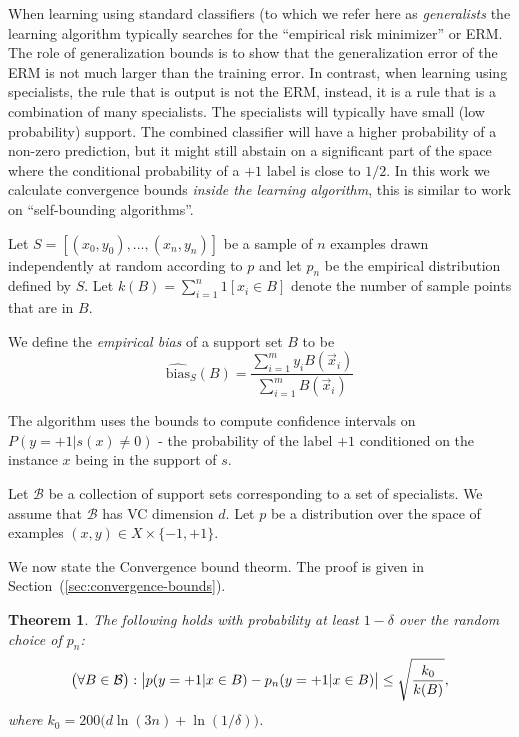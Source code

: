\documentclass{article}
\newtheorem{theorem}{Theorem}[section]
\newcommand{\B}{{\cal B}}
\newcommand{\x}{\vec{x}}
\newcommand{\cB}{\mathcal{B}}
\newcommand{\ebias}{\widehat{\text{bias}}}
\newcommand{\samp}{S}
\newcommand{\comment}[3]{\marginpar{\textcolor{#2}{#1: #3}}}
\newcommand{\yoav}[1]{\comment{Yoav}{blue}{#1}}
\begin{document}
When learning using standard classifiers (to which we refer here as
{\em generalists} the learning algorithm typically searches for the
``empirical risk minimizer'' or ERM. The role of generalization bounds
is to show that the generalization error of the ERM is not much larger
than the training error. In contrast, when learning using specialists,
the rule that is output is not the ERM, instead, it is a rule that is
a combination of many specialists. The specialists will typically have
small (low probability) support. The combined classifier will have a
higher probability of a non-zero prediction, but it might still
abstain on a significant part of the space where the conditional
probability of a $+1$ label is close to $1/2$. In this work 
we calculate convergence bounds {\em inside the
  learning algorithm}, this is similar to work on ``self-bounding
algorithms''.
\fi

Let $\samp = [(x_0,y_0),\ldots,(x_n,y_n)]$ be a sample of $n$ examples
drawn independently at random according to $p$ and let $p_n$ be the
empirical distribution defined by $S$.  Let $k(B) = \sum_{i=1}^n
1[x_i\in B]$ denote the number of sample points that are in $B$.

We define the {\em empirical bias} of a support set $B$ to be
\[
\ebias_{\samp}(B) = \frac{\sum_{i=1}^m y_i B(\x_i)}{\sum_{i=1}^m B(\x_i)}
\]



The algorithm uses the bounds to compute confidence
intervals on $P(y=+1|s(x) \neq 0)$ - the probability of the label $+1$
conditioned on the instance $x$ being in the support of $s$.

Let $\cB$ be a collection of support sets corresponding to a set of
specialists. We assume that $\cB$ has VC dimension $d$. Let $p$ be a
distribution over the space of examples $(x,y) \in X \times
\{-1,+1\}$.


We now state the Convergence bound theorm. The proof is given in Section~(\ref{sec:convergence-bounds}).

\yoav{I don't think that the term ``uniform'' is appropriate here,
  because the bound is not uniform - there is a different bound for
  each rule, depending on $k$.}
\begin{theorem}\label{thm:UCECM}
The following holds with probability at least $1-\delta$ over the
random choice of $p_n$:
\[\bigl(\forall B\in\B\bigr):\bigl\lvert p( y=+1 \vert x \in B) -
p_n(y=+1 \vert x \in B) \bigr\rvert \leq \sqrt{\frac{k_0}{k(B)}},\]
where $k_0 =200\bigl(d\ln(3n) + \ln(1/\delta)\bigr)$.
\end{theorem}
\end{document}
